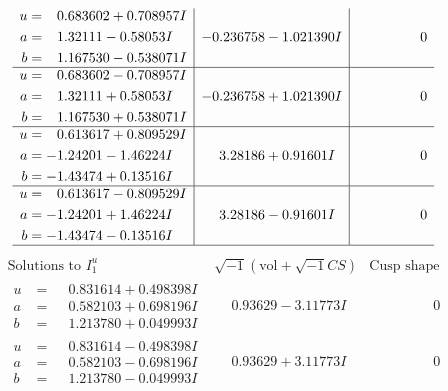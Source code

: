 \documentclass[1p]{elsarticle_modified}
\theoremstyle{definition}
\newcommand{\I}{\sqrt{-1}}
\begin{document}
$$\begin{array}{c|c|c}
\begin{aligned}
u &= \phantom{-}0.683602 + 0.708957 I \\
a &= \phantom{-}1.32111 - 0.58053 I \\
b &= \phantom{-}1.167530 - 0.538071 I\end{aligned}
 & -0.236758 - 1.021390 I & \phantom{-0.000000 } 0 \\ \hline\begin{aligned}
u &= \phantom{-}0.683602 - 0.708957 I \\
a &= \phantom{-}1.32111 + 0.58053 I \\
b &= \phantom{-}1.167530 + 0.538071 I\end{aligned}
 & -0.236758 + 1.021390 I & \phantom{-0.000000 } 0 \\ \hline\begin{aligned}
u &= \phantom{-}0.613617 + 0.809529 I \\
a &= -1.24201 - 1.46224 I \\
b &= -1.43474 + 0.13516 I\end{aligned}
 & \phantom{-}3.28186 + 0.91601 I & \phantom{-0.000000 } 0 \\ \hline\begin{aligned}
u &= \phantom{-}0.613617 - 0.809529 I \\
a &= -1.24201 + 1.46224 I \\
b &= -1.43474 - 0.13516 I\end{aligned}
 & \phantom{-}3.28186 - 0.91601 I & \phantom{-0.000000 } 0\\
 \hline 
 \end{array}$$\newpage$$\begin{array}{c|c|c}  
\text{Solutions to }I^u_{1}& \I (\text{vol} + \sqrt{-1}CS) & \text{Cusp shape}\\
 \hline 
\begin{aligned}
u &= \phantom{-}0.831614 + 0.498398 I \\
a &= \phantom{-}0.582103 + 0.698196 I \\
b &= \phantom{-}1.213780 + 0.049993 I\end{aligned}
 & \phantom{-}0.93629 - 3.11773 I & \phantom{-0.000000 } 0 \\ \hline\begin{aligned}
u &= \phantom{-}0.831614 - 0.498398 I \\
a &= \phantom{-}0.582103 - 0.698196 I \\
b &= \phantom{-}1.213780 - 0.049993 I\end{aligned}
 & \phantom{-}0.93629 + 3.11773 I & \phantom{-0.000000 } 0 \\ \hline\begin{aligned}

\end{aligned}
\end{array}$$
\end{document}
